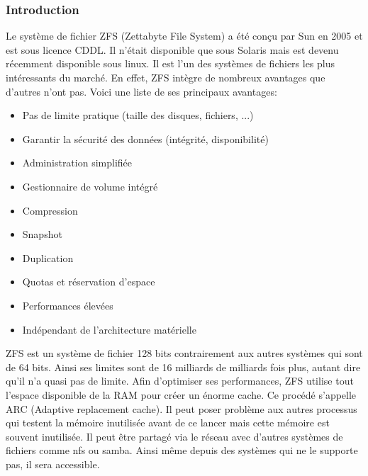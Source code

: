 \documentclass[a4paper,11pt]{report}
\begin{document}
	\subsubsection{Introduction}
	Le système de fichier ZFS (Zettabyte File System) a été conçu par Sun en 2005 et est sous licence CDDL.  Il n'était disponible que sous Solaris mais est devenu récemment disponible sous linux. Il est l'un des systèmes de fichiers les plus intéressants du marché. En effet, ZFS intègre de nombreux avantages que d'autres n'ont pas. Voici une liste de ses principaux avantages: \\
	\begin{itemize}
		 \item Pas de limite pratique (taille des disques, fichiers, ...)
		 \item Garantir la sécurité des données (intégrité, disponibilité)
		 \item Administration simplifiée
		 \item Gestionnaire de volume intégré
		 \item Compression
		 \item Snapshot
		 \item Duplication
		 \item Quotas et réservation d’espace
		 \item Performances élevées
		 \item Indépendant de l’architecture matérielle\\
	\end{itemize}
	ZFS est un système de fichier 128 bits contrairement aux autres systèmes qui sont de 64 bits. Ainsi ses limites sont de 16 milliards de milliards fois plus, autant dire qu'il n'a quasi pas de limite. Afin d'optimiser ses performances, ZFS utilise tout l'espace disponible de la RAM pour créer un énorme cache. Ce procédé s'appelle ARC (Adaptive replacement cache). Il peut poser problème aux autres processus qui testent la mémoire inutilisée avant de ce lancer mais cette mémoire est souvent inutilisée. Il peut être partagé via le réseau avec d'autres systèmes de fichiers comme nfs ou samba. Ainsi même depuis des systèmes qui ne le supporte pas, il sera accessible.\\
\end{document}
